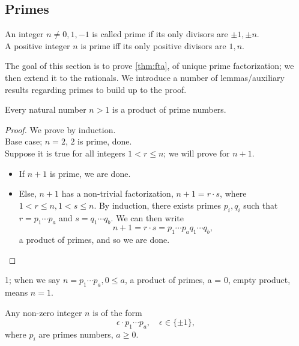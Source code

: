 \documentclass[12pt,oneside]{article}
\begin{document}
\subsection{Primes}

\begin{definition}[Prime]
  An integer $n \neq 0, 1, -1$ is called prime if its only divisors are $\pm 1, \pm n$.\\
  A positive integer $n$ is prime iff its only positive divisors are $1, n$.
\end{definition}

\begin{remark}
  The goal of this section is to prove \cref{thm:fta}, of unique prime factorization; we then extend it to the rationals. We introduce a number of lemmas/auxiliary results regarding primes to build up to the proof.
\end{remark}

\begin{lemma}\label{lemma:primefactorization}
 Every natural number $n > 1$ is a product of prime numbers.
\end{lemma}

\begin{proof}
  We prove by induction.\\
  Base case; $n = 2$, $2$ is prime, done.\\
  Suppose it is true for all integers $1 < r \leq n$; we will prove for $n+1$.\footnotemark
  \begin{itemize}
    \item If $n+1$ is prime, we are done.
    \item Else, $n+1$ has a non-trivial factorization, $n + 1 = r \cdot s$, where $1 < r \leq n, 1 < s \leq n$. By induction, there exists primes $p_i, q_i$ such that $r = p_1 \cdots p_a$ and $s = q_1 \cdots q_b$. We can then write $$n + 1 = r \cdot s = p_1 \cdots p_a q_1 \cdots q_b,$$ a product of primes, and so we are done.
  \end{itemize}
\end{proof}

\begin{definition}
  1; when we say $n = p_1 \cdots p_a, 0 \leq a$, a product of primes, a = 0, empty product, means $n = 1$.
\end{definition}

\begin{corollary}
  Any non-zero integer $n$ is of the form $$\epsilon \cdot p_1 \cdots p_a, \quad \epsilon \in \{\pm 1\}, $$ where $p_i$ are primes numbers, $a \geq 0$.
\end{corollary}
\end{document}
